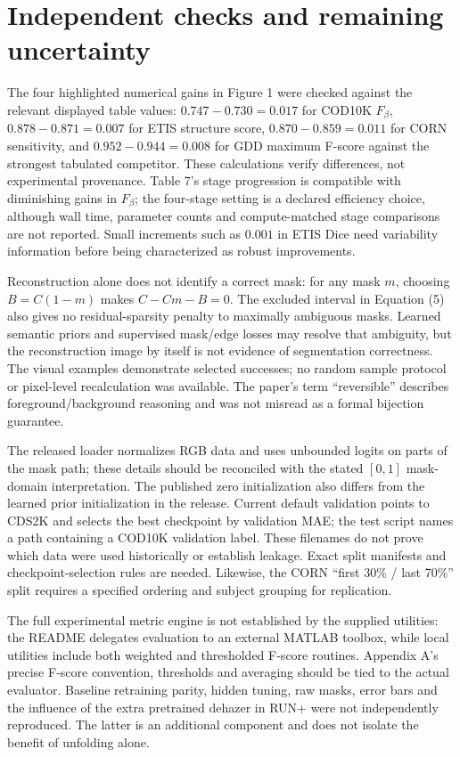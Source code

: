 \documentclass[10pt]{article}
\begin{document}
\section*{Independent checks and remaining uncertainty}
The four highlighted numerical gains in Figure 1 were checked against the relevant displayed table values: \(0.747-0.730=0.017\) for COD10K \(F_\beta\), \(0.878-0.871=0.007\) for ETIS structure score, \(0.870-0.859=0.011\) for CORN sensitivity, and \(0.952-0.944=0.008\) for GDD maximum F-score against the strongest tabulated competitor. These calculations verify differences, not experimental provenance. Table 7’s stage progression is compatible with diminishing gains in \(F_\beta\); the four-stage setting is a declared efficiency choice, although wall time, parameter counts and compute-matched stage comparisons are not reported. Small increments such as \(0.001\) in ETIS Dice need variability information before being characterized as robust improvements.\par
Reconstruction alone does not identify a correct mask: for any mask \(m\), choosing \(B=C(1-m)\) makes \(C-Cm-B=0\). The excluded interval in Equation (5) also gives no residual-sparsity penalty to maximally ambiguous masks. Learned semantic priors and supervised mask/edge losses may resolve that ambiguity, but the reconstruction image by itself is not evidence of segmentation correctness. The visual examples demonstrate selected successes; no random sample protocol or pixel-level recalculation was available. The paper’s term “reversible” describes foreground/background reasoning and was not misread as a formal bijection guarantee.\par
The released loader normalizes RGB data and uses unbounded logits on parts of the mask path; these details should be reconciled with the stated \([0,1]\) mask-domain interpretation. The published zero initialization also differs from the learned prior initialization in the release. Current default validation points to CDS2K and selects the best checkpoint by validation MAE; the test script names a path containing a COD10K validation label. These filenames do not prove which data were used historically or establish leakage. Exact split manifests and checkpoint-selection rules are needed. Likewise, the CORN “first 30\% / last 70\%” split requires a specified ordering and subject grouping for replication.\par
The full experimental metric engine is not established by the supplied utilities: the README delegates evaluation to an external MATLAB toolbox, while local utilities include both weighted and thresholded F-score routines. Appendix A’s precise F-score convention, thresholds and averaging should be tied to the actual evaluator. Baseline retraining parity, hidden tuning, raw masks, error bars and the influence of the extra pretrained dehazer in RUN+ were not independently reproduced. The latter is an additional component and does not isolate the benefit of unfolding alone.\par
\end{document}
